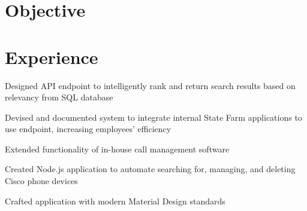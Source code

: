 \documentclass[letterpaper]{deedy-resume} %
\begin{document}
\begin{minipage}[t]{0.66\textwidth} %



\section{Objective}

\sectionspace %




\section{Experience}


\vspace{\topsep} %
\begin{tightitemize}
\item Designed API endpoint to intelligently rank and return search results based on relevancy from SQL database
\item Devised and documented system to integrate internal State Farm applications to use endpoint, increasing employees' efficiency
\end{tightitemize}

\sectionspace %


\begin{tightitemize}
\item Extended functionality of in-house call management software
\item Created Node.js application to automate searching for, managing, and deleting Cisco phone devices
\item Crafted application with modern Material Design standards
\end{tightitemize}


\end{minipage}
\end{document}
